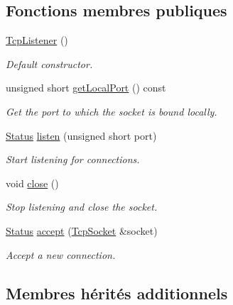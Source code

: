 \subsection*{Fonctions membres publiques}
\begin{DoxyCompactItemize}
\item 
\mbox{\label{classsf_1_1TcpListener_a59a1db5b6f4711a3e57390da2f8d9630}} 
\hyperlink{classsf_1_1TcpListener_a59a1db5b6f4711a3e57390da2f8d9630}{Tcp\+Listener} ()
\begin{DoxyCompactList}\small\item\em Default constructor. \end{DoxyCompactList}\item 
unsigned short \hyperlink{classsf_1_1TcpListener_a784b9a9c59d4cdbae1795e90b8015780}{get\+Local\+Port} () const
\begin{DoxyCompactList}\small\item\em Get the port to which the socket is bound locally. \end{DoxyCompactList}\item 
\hyperlink{classsf_1_1Socket_a51bf0fd51057b98a10fbb866246176dc}{Status} \hyperlink{classsf_1_1TcpListener_a409d9350d3abfea9636df8cf4a61004e}{listen} (unsigned short port)
\begin{DoxyCompactList}\small\item\em Start listening for connections. \end{DoxyCompactList}\item 
void \hyperlink{classsf_1_1TcpListener_a3a00a850506bd0f9f48867a0fe59556b}{close} ()
\begin{DoxyCompactList}\small\item\em Stop listening and close the socket. \end{DoxyCompactList}\item 
\hyperlink{classsf_1_1Socket_a51bf0fd51057b98a10fbb866246176dc}{Status} \hyperlink{classsf_1_1TcpListener_ae2c83ce5a64d50b68180c46bef0a7346}{accept} (\hyperlink{classsf_1_1TcpSocket}{Tcp\+Socket} \&socket)
\begin{DoxyCompactList}\small\item\em Accept a new connection. \end{DoxyCompactList}\end{DoxyCompactItemize}
\subsection*{Membres hérités additionnels}


